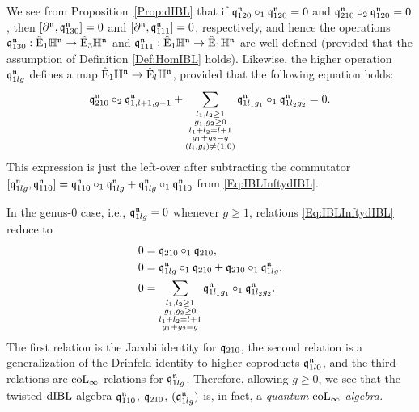 \documentclass[\MainFolder/Text.tex]{subfiles}
\begin{document}
\begin{Remark}\label{Rem:Higher}
\begin{RemarkList}
\item We see from Proposition~\ref{Prop:dIBL} that if $\mathfrak{q}_{120}^{\mathfrak{n}} \circ_1 \mathfrak{q}_{120}^{\mathfrak{n}} = 0$ and $\mathfrak{q}_{210}^{\mathfrak{n}} \circ_{2} \mathfrak{q}_{120}^{\mathfrak{n}} = 0$, then $[\partial^{\mathfrak{n}}, \mathfrak{q}_{130}^{\mathfrak{n}}] = 0$ and $[\partial^{\mathfrak{n}}, \mathfrak{q}_{111}^{\mathfrak{n}}] = 0$, respectively, and hence the operations $\mathfrak{q}_{130}^{\mathfrak{n}}: \hat{\mathrm{E}}_1\mathbb{H}^{\mathfrak{n}}\rightarrow \hat{\mathrm{E}}_3\mathbb{H}^{\mathfrak{n}}$ and $\mathfrak{q}_{111}^{\mathfrak{n}}: \hat{\mathrm{E}}_1\mathbb{H}^{\mathfrak{n}}\rightarrow \hat{\mathrm{E}}_1\mathbb{H}^{\mathfrak{n}}$ are well-defined (provided that the assumption of Definition \ref{Def:HomIBL} holds). Likewise, the higher operation~$\mathfrak{q}_{1lg}^{\mathfrak{n}}$ defines a map $\hat{\mathrm{E}}_1\mathbb{H}^{\mathfrak{n}} \rightarrow \hat{\mathrm{E}}_l\mathbb{H}^{\mathfrak{n}}$, provided that the following equation holds:
$$ \mathfrak{q}^{\mathfrak{n}}_{210}\circ_2 \mathfrak{q}_{1,l+1,g-1}^{\mathfrak{n}} + \sum_{\substack{l_1, l_2 \ge 1 \\ g_1, g_2 \ge 0 \\ l_1 + l_2 = l+1 \\ g_1 + g_2 = g \\ (l_i,g_i)\neq (1,0)}} \mathfrak{q}^{\mathfrak{n}}_{1l_1 g_1}\circ_1 \mathfrak{q}^{\mathfrak{n}}_{1 l_2 g_2} = 0. $$
This expression is just the left-over after subtracting the commutator $[\mathfrak{q}_{1lg}^{\mathfrak{n}},\mathfrak{q}_{110}^{\mathfrak{n}}] = \mathfrak{q}_{110}^{\mathfrak{n}} \circ_1 \mathfrak{q}_{1lg}^{\mathfrak{n}} + \mathfrak{q}_{1lg}^{\mathfrak{n}} \circ_1 \mathfrak{q}_{110}^{\mathfrak{n}}$ from \eqref{Eq:IBLInftydIBL}.
\item In the genus-$0$ case, i.e., $\mathfrak{q}_{1lg}^{\mathfrak{n}} = 0$ whenever $g\ge 1$, relations \eqref{Eq:IBLInftydIBL} reduce to
\begin{align*}
 0 & = \mathfrak{q}_{210}\circ_1\mathfrak{q}_{210}, \\
 0 & = \mathfrak{q}_{1lg}^{\mathfrak{n}}\circ_1\mathfrak{q}_{210} + \mathfrak{q}_{210}\circ_1\mathfrak{q}_{1lg}^{\mathfrak{n}}, \\
 0 & = \sum_{\substack{l_1,l_2\ge 1\\ g_1, g_2 \ge 0 \\ l_1 + l_2 = l + 1 \\ g_1 + g_2 = g}} \mathfrak{q}_{1l_1 g_1}^{\mathfrak{n}} \circ_1 \mathfrak{q}_{1l_2 g_2}^{\mathfrak{n}}.
\end{align*}
The first relation is the Jacobi identity for $\mathfrak{q}_{210}$, the second relation is a generalization of the Drinfeld identity to higher coproducts $\mathfrak{q}_{1l0}^{\mathfrak{n}}$, and the third relations are $\mathrm{coL}_\infty$-relations for $\mathfrak{q}_{1lg}^{\mathfrak{n}}$. Therefore, allowing $g\ge 0$, we see that the twisted $\mathrm{dIBL}$-algebra $\mathfrak{q}_{110}^{\mathfrak{n}}$, $\mathfrak{q}_{210}$, $(\mathfrak{q}_{1lg}^{\mathfrak{n}})$ is, in fact, a \emph{quantum $\mathrm{coL}_\infty$-algebra.}
\end{RemarkList}
\end{Remark}
\end{document}
